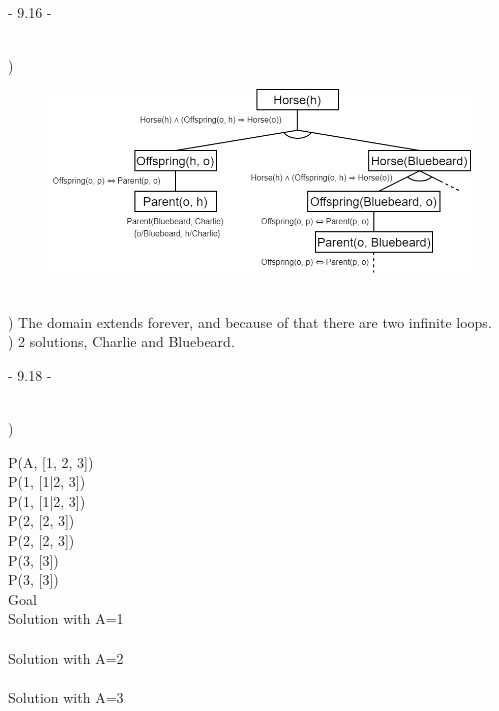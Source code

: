 \documentclass[12pt]{article}
\begin{document}
\noindent \hrulefill \\



\centerline{- 9.16 - }
\ \\
) 
\begin{figure}[h!]
  \centering
  \includegraphics[scale=.6]{Pics/HW4_Q9-16.png}
\end{figure}\\[.4em]
) The domain extends forever, and because of that there are two infinite loops.\\[.4em]
) 2 solutions, Charlie and Bluebeard.\\[.4em]



\noindent \hrulefill \pagebreak



\centerline{- 9.18 - }
\ \\
) \begin{multicols}{2}
\hspace*{0pt}\hfill P(A, [1, 2, 3])\\
\hspace*{0pt}\hfill P(1, [1|2, 3])\\
\hspace*{0pt}\hfill P(1, [1|2, 3])\\
\hspace*{0pt}\hfill P(2, [2, 3])\\
\hspace*{0pt}\hfill P(2, [2, 3])\\
\hspace*{0pt}\hfill P(3, [3])\\
\hspace*{0pt}\hfill P(3, [3])\\
Goal\\
Solution with A=1\\\\
Solution with A=2\\\\
Solution with A=3\\
\end{multicols}
\end{document}
